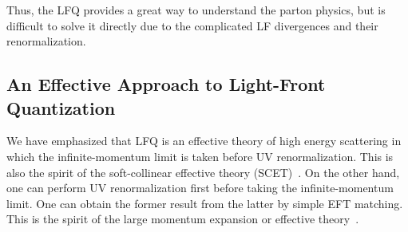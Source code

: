\documentclass[twocolumn,superscriptaddress,longbibliography,10pt]{revtex4-1}
\begin{document}
Thus, the LFQ provides a great way
to understand the parton physics, but is difficult to solve
it directly due to the complicated LF divergences and their renormalization.


\subsection{An Effective Approach to Light-Front Quantization}

We have emphasized that LFQ is an effective theory of high energy scattering in
which the infinite-momentum limit is taken before UV renormalization. This is also the spirit of the soft-collinear effective theory (SCET)~\cite{Bauer:2000yr,Bauer:2001yt}. On the other hand,
one can perform UV renormalization first before taking
the infinite-momentum limit. One can obtain the former
result from the latter by simple EFT matching.
This is the spirit of the large momentum expansion
or effective theory~\cite{Ji:2013dva,Ji:2014hxa}.
\end{document}
